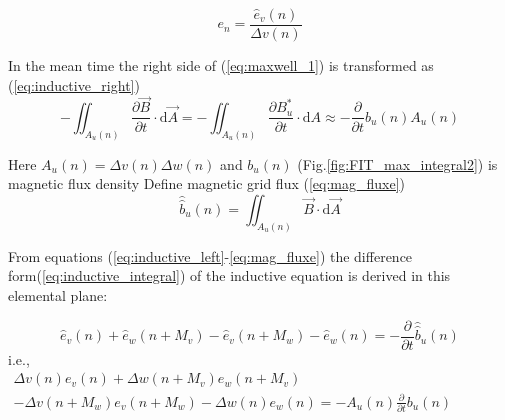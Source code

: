 \begin{equation}
e_{n}=\frac{\widehat{e}_{v}(n)}{\Delta v(n)}
\label{eq:e_field}
\end{equation}

In the mean time the right side of (\ref{eq:maxwell_1}) is transformed as (\ref{eq:inductive_right})
\begin{equation}
-\iint_{A_{u}(n)}\frac{\partial\vec{B}}{\partial t}\cdot\mathrm{d}\vec{A} 
=-\iint_{A_{u}(n)}\frac{\partial B^{*}_{u}}{\partial t}\cdot\mathrm{d}A
\approx -\frac{\partial}{\partial t}b_{u}(n)A_{u}(n)
\label{eq:inductive_right}
\end{equation}

Here $A_{u}(n)=\Delta v(n)\Delta w(n)$ and $b_{u}(n)$ (Fig.\ref{fig:FIT_max_integral2}) is magnetic flux density
Define magnetic grid flux (\ref{eq:mag_fluxe})
\begin{equation}
\widehat{\widehat{b}}_{u}(n)=\iint_{A_{u}(n)}\vec{B}\cdot\mathrm{d}\vec{A}
\label{eq:mag_fluxe}
\end{equation}

From equations (\ref{eq:inductive_left}-\ref{eq:mag_fluxe}) the difference form(\ref{eq:inductive_integral}) of the inductive equation is derived in this elemental plane:

\begin{equation}
\widehat{e}_{v}(n)+\widehat{e}_{w}(n+M_{v})-\widehat{e}_{v}(n+M_{w})-\widehat{e}_{w}(n)=-\frac{\partial}{\partial t}\widehat{\widehat{b}}_{u}(n)
\label{eq:inductive_integral}
\end{equation}
i.e.,
\begin{multline}
\Delta v(n)e_{v}(n)+\Delta w(n+M_{v})e_{w}(n+M_{v})\\
-\Delta v(n+M_{w})e_{v}(n+M_{w})-\Delta w(n)e_{w}(n)=-A_{u}(n)\frac{\partial}{\partial{t}}b_{u}(n) \hspace{5cm}
\label{eq:inductive_sample}
\end{multline}

